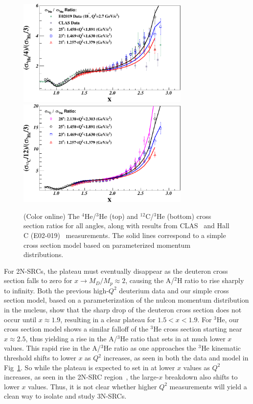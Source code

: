                \begin{figure}[!ht]
		\begin{center}
		  \includegraphics[width=8.5cm,angle=0]{He4_He3_XS_Ratio_MC_XbjJan08_XbjJan08}
                  \includegraphics[width=8.5cm,angle=0]{C12_He3_XS_Ratio_MC_XbjJan08_XbjJan08}
		\end{center}
		\vspace*{-5mm}
		\caption{(Color online) The $^4$He/$^3$He (top) and $^{12}$C/$^3$He (bottom) cross section ratios for all angles, 
		  along with results from CLAS~\cite{PhysRevLett.96.082501} and Hall C (E02-019)~\cite{fomin2012} measurements. The solid lines
                  correspond to a simple cross section model based on parameterized momentum distributions.}
		\label{fig:ratios_allqsq}
		\end{figure}

For 2N-SRCs, the plateau must eventually disappear as the deuteron cross section falls to zero for $ x \to
M_D / M_p\approx 2$, causing the A/$^2$H ratio to rise sharply to infinity. Both the previous high-$Q^2$
deuterium data and our simple cross section model, based on a parameterization of the nulcon momentum
distribution in the nucleus, show that the
sharp drop of the deuteron cross section does not occur until $x \approx 1.9$, resulting in a clear plateau
for $1.5 < x < 1.9$. For $^3$He, our cross section model shows a similar falloff of the $^3$He cross section
starting near $x \approx 2.5$, thus yielding a rise in the A/$^3$He ratio that sets in at much lower $x$
values. This rapid rise in the A/$^3$He ratio as one approaches the $^3$He kinematic threshold shifts to
lower $x$ as $Q^2$ increases, as seen in both the data and model in Fig~\ref{fig:ratios_allqsq}. So while
the plateau is expected to set in at lower $x$ values as $Q^2$ increases, as seen in the 2N-SRC
region~\cite{ SLAC_Measurement_PRC.48.2451, PhysRevLett.96.082501}, the large-$x$ breakdown also shifts to
lower $x$ values. Thus, it is not clear whether higher $Q^2$ measurements will yield a clean way to isolate
and study 3N-SRCs.

